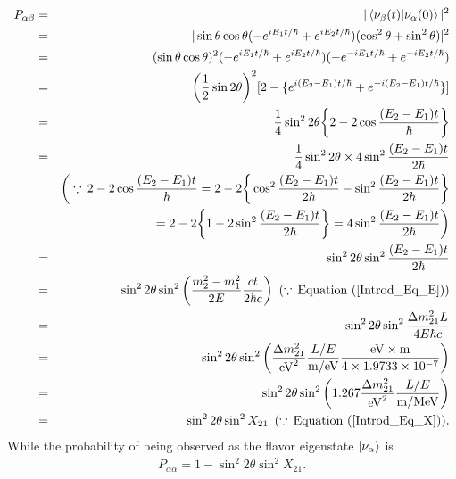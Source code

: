 \begin{eqnarray}
	P_{\alpha\beta} &=& |\braket{\nu_{\beta}(t)|\nu_{\alpha}(0)}|^{2} \nonumber \\
	                &=& |\sin\theta\cos\theta(-e^{iE_{1}t/\hbar} + e^{iE_{2}t/\hbar})(\cos^{2}\theta + \sin^{2}\theta)|^{2} \nonumber \\
	                &=& (\sin\theta\cos\theta)^{2}(-e^{iE_{1}t/\hbar} + e^{iE_{2}t/\hbar})(-e^{-iE_{1}t/\hbar} + e^{-iE_{2}t/\hbar}) \nonumber \\
	                &=& \bigg({1 \over 2}\sin2\theta\bigg)^{2}[2 - \{e^{i(E_{2} - E_{1})t/\hbar} + e^{-i(E_{2} - E_{1})t/\hbar}\}] \nonumber \\
	                &=& {1 \over 4}\sin^{2}2\theta\bigg\{2 - 2\cos{(E_{2} - E_{1})t \over \hbar}\bigg\} \nonumber \\
	                &=& {1 \over 4}\sin^{2}2\theta \times 4\sin^{2}{(E_{2} - E_{1})t \over 2\hbar} \nonumber \\
	                & & \bigg(\because\, 2 - 2\cos{(E_{2} - E_{1})t \over \hbar} = 2 - 2\bigg\{\cos^{2}{(E_{2} - E_{1})t \over 2\hbar} - \sin^{2}{(E_{2} - E_{1})t \over 2\hbar}\bigg\} \nonumber \\
	                & & = 2 - 2\bigg\{1 - 2\sin^{2}{(E_{2} - E_{1})t \over 2\hbar}\bigg\} = 4\sin^{2}{(E_{2} - E_{1})t \over 2\hbar}\bigg) \nonumber \\
	                &=& \sin^{2}2\theta\sin^{2}{(E_{2} - E_{1})t \over 2\hbar} \nonumber \\
	                &=& \sin^{2}2\theta\sin^{2}\bigg({m_{2}^{2} - m_{1}^{2} \over 2E}{ct \over 2\hbar c}\bigg) \,\,\, (\because\,\text{Equation~(\ref{Introd_Eq_E})}) \nonumber \\
	                &=& \sin^{2}2\theta\sin^{2}{\Delta m_{21}^{2}L \over 4E\hbar c} \nonumber \\
	                &=& \sin^{2}2\theta\sin^{2}\bigg({\Delta m_{21}^{2} \over {\rm eV}^{2}}{L/E \over {\rm m}/{\rm eV}}{{\rm eV} \times {\rm m} \over 4 \times 1.9733 \times 10^{-7}}\bigg) \nonumber \\
	                &=& \sin^{2}2\theta\sin^{2}\bigg(1.267{\Delta m_{21}^{2} \over {\rm eV}^{2}}{L/E \over {\rm m}/{\rm MeV}}\bigg) \nonumber \\
	                &=& \sin^{2}2\theta\sin^{2}X_{21} \,\,\, (\because\,\text{Equation~(\ref{Introd_Eq_X})}).
\end{eqnarray}
While the probability of being observed as the flavor eigenstate $\ket{\nu_{\alpha}}$ is
\begin{eqnarray}
	P_{\alpha\alpha} = 1 - \sin^{2}2\theta\sin^{2}X_{21}.
\end{eqnarray}

